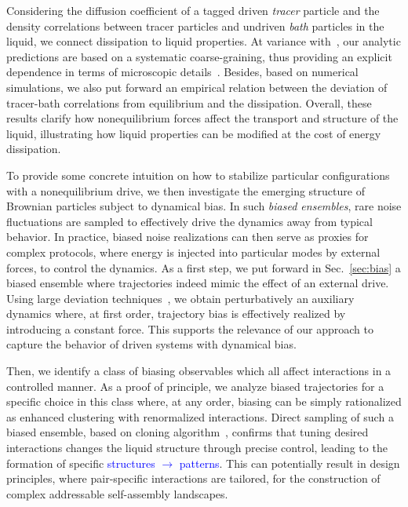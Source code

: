 \documentclass[pre, superscriptaddress, twocolumn,pre]{revtex4-1}
\begin{document}
Considering the diffusion coefficient of a tagged driven \textit{tracer} particle and the density correlations between tracer particles and undriven \textit{bath} particles in the liquid, we connect dissipation to liquid properties. At variance with~\cite{delJunco2018}, our analytic predictions are based on a systematic coarse-graining, thus providing an explicit dependence in terms of microscopic details~\cite{Dean1996, Demery2011, Demery2014}. Besides, based on numerical simulations, we also put forward an empirical relation between the deviation of tracer-bath correlations from equilibrium and the dissipation. Overall, these results clarify how nonequilibrium forces affect the transport and structure of the liquid, illustrating how liquid properties can be modified at the cost of energy dissipation.


To provide some concrete intuition on how to stabilize particular configurations with a nonequilibrium drive, we then investigate the emerging structure of Brownian particles subject to dynamical bias. In such {\it biased ensembles}, rare noise fluctuations are sampled to effectively drive the dynamics away from typical behavior. In practice, biased noise realizations can then serve as proxies for complex protocols, where energy is injected into particular modes by external forces, to control the dynamics. As a first step, we put forward in Sec.~\ref{sec:bias} a biased ensemble where trajectories indeed mimic the effect of an external drive. Using large deviation techniques~\cite{garrahan2007, Hedges2009, Jack2010, Pitard2011, Speck2012, Bodineau2012a, Chetrite2013, Limmer2014, Nemoto2017}, we obtain perturbatively an auxiliary dynamics where, at first order, trajectory bias is effectively realized by introducing a constant force. This supports the relevance of our approach to capture the behavior of driven systems with dynamical bias.


Then, we identify a class of biasing observables which all affect interactions in a controlled manner. As a proof of principle, we analyze biased trajectories for a specific choice in this class where, at any order, biasing can be simply rationalized as enhanced clustering with renormalized interactions. Direct sampling of such a biased ensemble, based on cloning algorithm~\cite{Giadina2006, tailleur2007probing, Hurtado2009, Nemoto2016, Ray2018, Klymko2018, Brewer2018}, confirms that tuning desired interactions changes the liquid structure through precise control, leading to the formation of specific \textcolor{blue}{structures $\to$ patterns}. This can potentially result in design principles, where pair-specific interactions are tailored, for the construction of complex addressable self-assembly landscapes.
\end{document}
